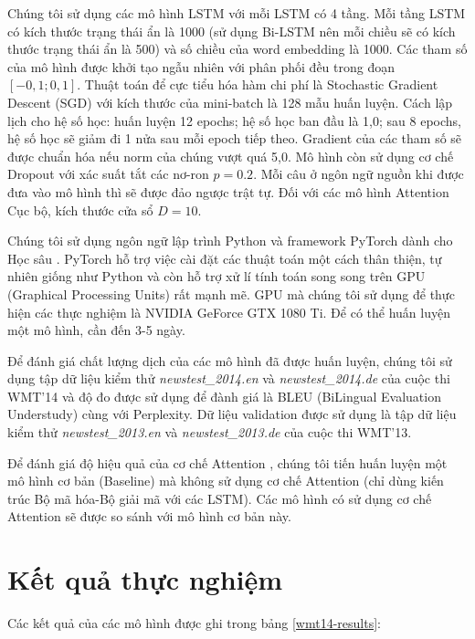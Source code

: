 Chúng tôi sử dụng các mô hình LSTM với mỗi LSTM có 4 tầng. Mỗi tầng LSTM có kích thước trạng thái ẩn là 1000 (sử dụng Bi-LSTM nên mỗi chiều sẽ có kích thước trạng thái ẩn là 500) và số chiều của word embedding là 1000. Các tham số của mô hình được khởi tạo ngẫu nhiên với phân phối đều trong đoạn $[-0,1; 0,1]$. Thuật toán để cực tiểu hóa hàm chi phí là Stochastic Gradient Descent (SGD) với kích thước của mini-batch là 128 mẫu huấn luyện. Cách lập lịch cho hệ số học: huấn luyện 12 epochs; hệ số học ban đầu là 1,0; sau 8 epochs, hệ số học sẽ giảm đi 1 nửa sau mỗi epoch tiếp theo. Gradient của các tham số sẽ được chuẩn hóa nếu norm của chúng vượt quá 5,0. Mô hình còn sử dụng cơ chế Dropout với xác suất tắt các nơ-ron $p = 0.2$. Mỗi câu ở ngôn ngữ nguồn khi được đưa vào mô hình thì sẽ được đảo ngược trật tự. Đối với các mô hình Attention Cục bộ, kích thước cửa sổ $D = 10$.

Chúng tôi sử dụng ngôn ngữ lập trình Python và framework PyTorch dành cho Học sâu \cite{pytorchworkshop}. PyTorch hỗ trợ việc cài đặt các thuật toán một cách thân thiện, tự nhiên giống như Python và còn hỗ trợ xử lí tính toán song song trên GPU (Graphical Processing Units) rất mạnh mẽ. GPU mà chúng tôi sử dụng để thực hiện các thực nghiệm là NVIDIA GeForce GTX 1080 Ti. Để có thể huấn luyện một mô hình, cần đến 3-5 ngày.

Để đánh giá chất lượng dịch của các mô hình đã được huấn luyện, chúng tôi sử dụng tập dữ liệu kiểm thử \textit{newstest\_2014.en} và \textit{newstest\_2014.de} của cuộc thi WMT'14 và độ đo được sử dụng để đành giá là BLEU (BiLingual Evaluation Understudy) \cite{BLEUpaper} cùng với Perplexity. Dữ liệu validation được sử dụng là tập dữ liệu kiểm thử \textit{newstest\_2013.en} và \textit{newstest\_2013.de} của cuộc thi WMT'13.

Để đánh giá độ hiệu quả của cơ chế Attention , chúng tôi tiến huấn luyện một mô hình cơ bản (Baseline) mà không sử dụng cơ chế Attention (chỉ dùng kiến trúc Bộ mã hóa-Bộ giải mã với các LSTM). Các mô hình có sử dụng cơ chế Attention sẽ được so sánh với mô hình cơ bản này.

\section{Kết quả thực nghiệm}
Các kết quả của các mô hình được ghi trong bảng \ref{wmt14-results}:

